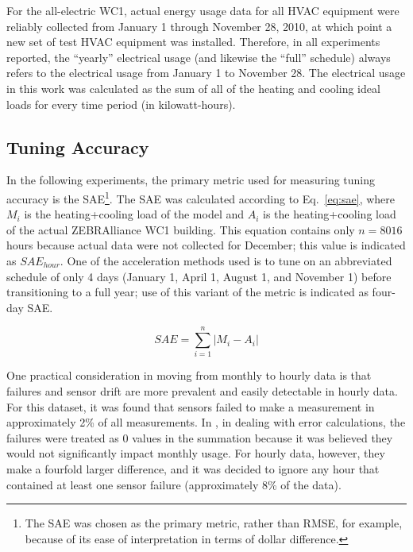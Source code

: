 \documentclass[preprint, review, 12pt]{elsarticle}
\begin{document}
For the all-electric WC1, actual energy usage data for all HVAC equipment were reliably collected from January 1 through November 28, 2010, at which point a new set of test HVAC equipment was installed. Therefore, in all experiments reported, the ``yearly'' electrical usage (and likewise the ``full'' schedule) always refers to the electrical usage from January 1 to November 28. The electrical usage in this work was calculated as the sum of all of the heating and cooling ideal loads for every time period (in kilowatt-hours).

\subsection{Tuning Accuracy}
In the following experiments, the primary metric used for measuring tuning accuracy is the SAE\footnote{The SAE was chosen as the primary metric, rather than RMSE, for example, because of its ease of interpretation in terms of dollar difference.}. The SAE was calculated according to Eq.~\ref{eq:sae}, where $M_i$ is the heating+cooling load of the model and $A_i$ is the heating+cooling load of the actual ZEBRAlliance WC1 building. This equation contains only  $n=8016$ hours because actual data were not collected for December; this value is indicated as $SAE_{hour}$. One of the acceleration methods used is to tune on an abbreviated schedule of only 4 days (January 1, April 1, August 1, and November 1) before transitioning to a full year; use of this variant of the metric is indicated as four-day SAE.

\begin{equation}
\label{eq:sae}
	SAE = \sum_{i=1}^{n}\left|M_i - A_i\right|
\end{equation}

One practical consideration in moving from monthly to hourly data is that failures and sensor drift are more prevalent and easily detectable in hourly data. For this dataset, it was found that sensors failed to make a measurement in approximately 2\% of all measurements. In \cite{cit:garrett2013}, in dealing with error calculations, the failures were treated as 0 values in the summation because it was believed they would not significantly impact monthly usage. For hourly data, however, they make a fourfold larger difference, and it was decided to ignore any hour that contained at least one sensor failure (approximately 8\% of the data).
\end{document}
